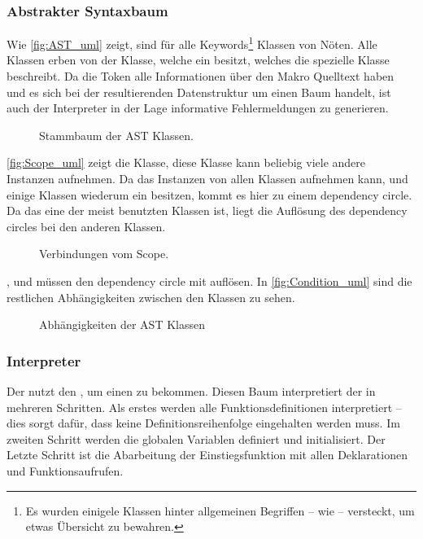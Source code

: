     \subsubsection{Abstrakter Syntaxbaum}
    \label{sssec:Abstrakter Syntaxbaum}
      Wie \autoref{fig:AST_uml} zeigt, sind für alle Keywords\footnote{
        Es wurden einigele Klassen hinter allgemeinen Begriffen -- wie  -- versteckt, um etwas Übersicht zu bewahren.
      } Klassen von Nöten. Alle Klassen erben von der  Klasse, welche ein  besitzt, welches die spezielle Klasse beschreibt. Da die Token alle Informationen  über den Makro Quelltext haben und es sich bei der resultierenden Datenstruktur um einen Baum handelt, ist auch der Interpreter in der Lage informative Fehlermeldungen zu generieren.
      \begin{figure}[H]
        \centering
        \caption{Stammbaum der AST Klassen.}
        \label{fig:AST_uml}
      \end{figure}

      \autoref{fig:Scope_uml} zeigt die  Klasse, diese Klasse kann beliebig viele andere  Instanzen aufnehmen.  Da das  Instanzen von allen  Klassen aufnehmen kann, und einige Klassen wiederum ein  besitzen, kommt es hier zu einem dependency circle. Da das  eine der meist benutzten Klassen ist, liegt die Auflösung des dependency circles bei den anderen Klassen.
      \begin{figure}[H]
        \centering
        \caption{Verbindungen vom Scope.}
        \label{fig:Scope_uml}
      \end{figure}

      ,  und  müssen den dependency circle mit  auflösen. In \autoref{fig:Condition_uml} sind die restlichen Abhängigkeiten zwischen den  Klassen zu sehen.
      \begin{figure}[H]
        \centering
        \caption{Abhängigkeiten der AST Klassen}
        \label{fig:Condition_uml}
      \end{figure}

    \subsubsection{Interpreter}
    \label{sssec:Interpreter}
      Der  nutzt den , um einen  zu bekommen. Diesen Baum interpretiert der  in mehreren Schritten. Als erstes werden alle Funktionsdefinitionen interpretiert -- dies sorgt dafür, dass keine Definitionsreihenfolge eingehalten werden muss. Im zweiten Schritt werden die globalen Variablen definiert und initialisiert. Der Letzte Schritt ist die Abarbeitung der Einstiegsfunktion mit allen Deklarationen und Funktionsaufrufen.

